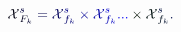 \documentclass[12pt]{article}
\begin{document}
\makeatletter
\renewcommand*{\@textcolor}[3]{%
  \protect\leavevmode
  \begingroup
    \color#1{#2}#3%
  \endgroup
}
\makeatother
\begin{displaymath}
\mathcal { \mathcolor[RGB]{0,0,15}{X} } _ { \mathcolor[RGB]{0,0,30}{F} _ { \mathcolor[RGB]{0,0,45}{k} } } ^ { \mathcolor[RGB]{0,0,60}{s} } \mathcolor[RGB]{0,0,75}{=} \mathcal { \mathcolor[RGB]{0,0,90}{X} } _ { \mathcolor[RGB]{0,0,105}{f} _ { \mathcolor[RGB]{0,0,120}{k} } } ^ { \mathcolor[RGB]{0,0,135}{s} } \mathcolor[RGB]{0,0,150}{\times} \mathcal { \mathcolor[RGB]{0,0,165}{X} } _ { \mathcolor[RGB]{0,0,180}{f} _ { \mathcolor[RGB]{0,0,195}{k} } } ^ { \mathcolor[RGB]{0,0,210}{s} } \mathcolor[RGB]{0,0,225}{.} \mathcolor[RGB]{0,0,240}{.} \mathcolor[RGB]{0,0,255}{.} \mathcolor[RGB]{0,15,0}{\times} \mathcal { \mathcolor[RGB]{0,15,15}{X} } _ { \mathcolor[RGB]{0,15,30}{f} _ { \mathcolor[RGB]{0,15,45}{k} } } ^ { \mathcolor[RGB]{0,15,60}{s} } \mathcolor[RGB]{0,15,75}{.}
\end{displaymath}
\end{document}
